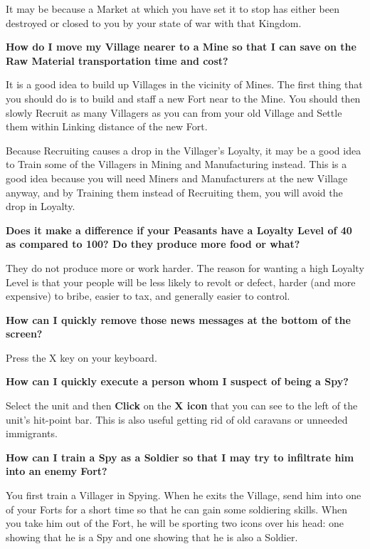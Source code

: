 It may be because a Market at which you have set it to stop has either been destroyed or closed to you by your state of war with that Kingdom.

{\large \textbf{\textsf{How do I move my Village nearer to a Mine so that I can save on the Raw Material transportation time and cost?}}}

It is a good idea to build up Villages in the vicinity of Mines. The first thing that you should do is to build and staff a new Fort near to the Mine. You should then slowly Recruit as many Villagers as you can from your old Village and Settle them within Linking distance of the new Fort.

Because Recruiting causes a drop in the Villager’s Loyalty, it may be a good idea to Train some of the Villagers in Mining and Manufacturing instead. This is a good idea because you will need Miners and Manufacturers at the new Village anyway, and by Training them instead of Recruiting them, you will avoid the drop in Loyalty.

{\large \textbf{\textsf{Does it make a difference if your Peasants have a Loyalty Level of 40 as compared to 100? Do they produce more food or what?}}}

They do not produce more or work harder. The reason for wanting a high Loyalty Level is that your people will be less likely to revolt or defect, harder (and more expensive) to bribe, easier to tax, and generally easier to control.

{\large \textbf{\textsf{How can I quickly remove those news messages at the bottom of the screen?}}}


Press the X key on your keyboard.

{\large \textbf{\textsf{How can I quickly execute a person whom I suspect of being a Spy?}}}


Select the unit and then \textbf{Click} on the \textbf{X icon} that you can see to the left of the unit’s hit-point bar. This is also useful getting rid of old caravans or unneeded immigrants.

{\large \textbf{\textsf{How can I train a Spy as a Soldier so that I may try to infiltrate him into an enemy Fort?}}}

You first train a Villager in Spying. When he exits the Village, send him into one of your Forts for a short time so that he can gain some soldiering skills. When you take him out of the Fort, he will be sporting two icons over his head: one showing that he is a Spy and one showing that he is also a Soldier.